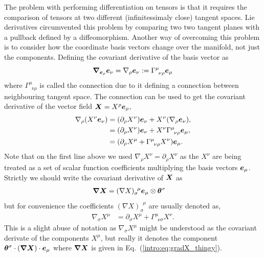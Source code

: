 The problem with performing differentiation on tensors is that it requires the comparison of tensors at two different (infinitessimaly close) tangent spaces. Lie derivatives circumvented this problem by comparing two two tangent planes with a pullback defined by a diffeomorphism. Another way of overcoming this problem is to consider how the coordinate basis vectors change over the manifold, not just the components. Defining the covariant derivative of the basis vector as
\begin{equation}
\boldsymbol{\nabla}_{\boldsymbol{e}_\rho} \boldsymbol{e}_\nu = \nabla_\rho \boldsymbol{e}_\nu := \Gamma^\mu_{\,\,\,\nu\rho}\boldsymbol{e}_\mu
\end{equation}
where $\Gamma^\mu_{\,\,\,\nu\rho}$ is called the connection due to it defining a connection between neighbouring tangent space. The connection can be used to get the covariant derivative of the vector field $\boldsymbol{X}=X^\rho \boldsymbol{e}_\rho$,
\begin{align}
\nabla_\rho (X^\nu \boldsymbol{e}_\nu) &= (\partial_\rho X^\nu )\boldsymbol{e}_\nu + X^\nu (\nabla_\rho \boldsymbol{e}_\nu),\\
&= (\partial_\rho X^\nu )\boldsymbol{e}_\nu + X^\nu \Gamma^\mu_{\,\,\,\nu\rho}\boldsymbol{e}_\mu,\\
&= (\partial_\rho X^\mu + \Gamma^\mu_{\,\,\,\nu\rho} X^\nu )\boldsymbol{e}_\mu.
\end{align}
Note that on the first line above we used $\nabla_\rho X^\nu=\partial_\rho X^\nu$ as the $X^\nu$ are being treated as a set of scalar function coefficients multiplying the basis vectors $\boldsymbol{e}_\mu$. Strictly we should write the covariant derivative of $\boldsymbol{X}$ as 
\begin{align}\label{intro:eq:gradX_thingy}
\boldsymbol{\nabla X} &= (\nabla X)^{\,\,\,\mu}_\sigma \boldsymbol{e}_\mu \otimes \boldsymbol{\theta}^\sigma 
\end{align}
but for convenience the coefficients $(\nabla X)^{\,\,\,\mu}_\sigma$ are usually denoted as, 
\begin{align}
{\nabla}_{\sigma} X^\mu &= \partial_\sigma X^\mu + \Gamma^\mu_{\,\,\,\nu\sigma} X^\nu.
\end{align}
This is a slight abuse of notation as $\nabla_\sigma X^\mu$ might be understood as the covariant derivate of the components $X^\mu$, but really it denotes the component $\boldsymbol{\theta}^\sigma\cdot(\boldsymbol{\nabla X})\cdot \boldsymbol{e}_\mu$ where $\boldsymbol{\nabla X}$ is given in Eq.~(\ref{intro:eq:gradX_thingy}).

